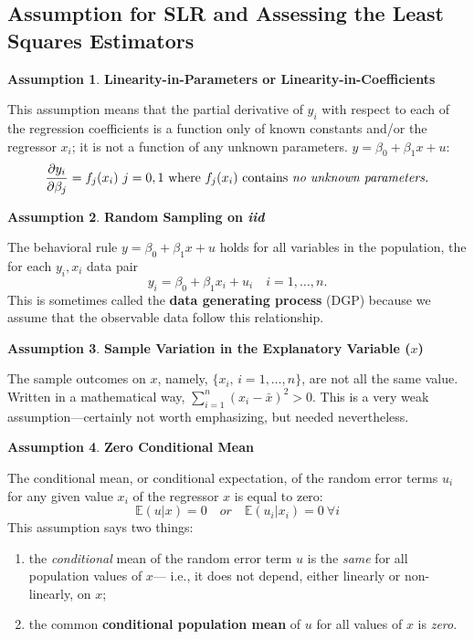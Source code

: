 \documentclass[a4paper, 10pt]{article}
\theoremstyle{definition}	%
\newtheorem{assumption}{Assumption}
\begin{document}
\subsection{Assumption for SLR and Assessing the Least Squares Estimators}
\begin{assumption}
    \textbf{Linearity-in-Parameters or Linearity-in-Coefficients}
\end{assumption}
This assumption means that the partial derivative of $y_i$ with respect to each of the regression coefficients is a function only of known constants and/or the regressor $x_i$; it is not a function of any unknown parameters. $y = \beta_0 + \beta_1x + u$:
\begin{equation*}
    \frac{\partial y_i}{\partial \beta_j} = f_j(x_i)\  j =0, 1\ \text{where $f_j(x_i)$ contains \textit{no unknown parameters.}} 
\end{equation*}
\begin{assumption}
   \textbf{ Random Sampling on \textit{iid}}
\end{assumption}
The behavioral rule $y = \beta_0 + \beta_1x + u$ holds for all variables in the population, the for each $y_i, x_i$ data pair
\begin{equation*}
    y_i = \beta_0 + \beta_1 x_i + u_i \quad i = 1, \dots, n.
\end{equation*}
This is sometimes called the \textbf{data generating process} (DGP) because we assume that the observable data follow this relationship.
\begin{assumption}
    \textbf{Sample Variation in the Explanatory Variable ($x$)}
\end{assumption}
The sample outcomes on \(x\), namely, \( \{x_i, \, i = 1, \ldots, n\} \), are not all the same value. Written in  a mathematical way, $\sum_{i=1}^{n}(x_i - \bar{x})^2 > 0$. This is a very weak assumption---certainly not worth emphasizing, but needed nevertheless. 
\begin{assumption}
   \textbf{ Zero Conditional Mean} 
\end{assumption}
The conditional mean, or conditional expectation, of the random error terms $u_i$ for any given value $x_i$ of the regressor $x$ is equal to zero:
\begin{equation*}
    \mathbb{E}(u|x) = 0 \quad or \quad \mathbb{E}(u_i|x_i) = 0 \ \forall i
\end{equation*}
This assumption says two things:
\begin{enumerate}
    \item the \textit{conditional} mean of the random error term $u$ is the \textit{same} for all population values of $x$--- i.e., it does not depend, either linearly or non-linearly, on $x$;
    \item the common \textbf{conditional population mean} of $u$ for all values of $x$ is \textit{zero}.
\end{enumerate}
\end{document}
